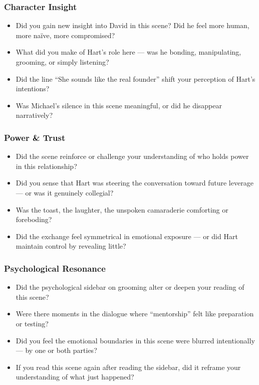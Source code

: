 \subsubsection{Character Insight}

\begin{itemize}
\item Did you gain new insight into David in this scene? Did he feel more human, more naïve, more compromised?
\item What did you make of Hart’s role here — was he bonding, manipulating, grooming, or simply listening?
\item Did the line “She sounds like the real founder” shift your perception of Hart’s intentions?
\item Was Michael’s silence in this scene meaningful, or did he disappear narratively?
\end{itemize}

\subsubsection{Power \& Trust}

\begin{itemize}
\item Did the scene reinforce or challenge your understanding of who holds power in this relationship?
\item Did you sense that Hart was steering the conversation toward future leverage — or was it genuinely collegial?
\item Was the toast, the laughter, the unspoken camaraderie comforting or foreboding?
\item Did the exchange feel symmetrical in emotional exposure — or did Hart maintain control by revealing little?
\end{itemize}

\subsubsection{Psychological Resonance}

\begin{itemize}
\item Did the psychological sidebar on grooming alter or deepen your reading of this scene?
\item Were there moments in the dialogue where “mentorship” felt like preparation or testing?
\item Did you feel the emotional boundaries in this scene were blurred intentionally — by one or both parties?
\item If you read this scene again after reading the sidebar, did it reframe your understanding of what just happened?
\end{itemize}


